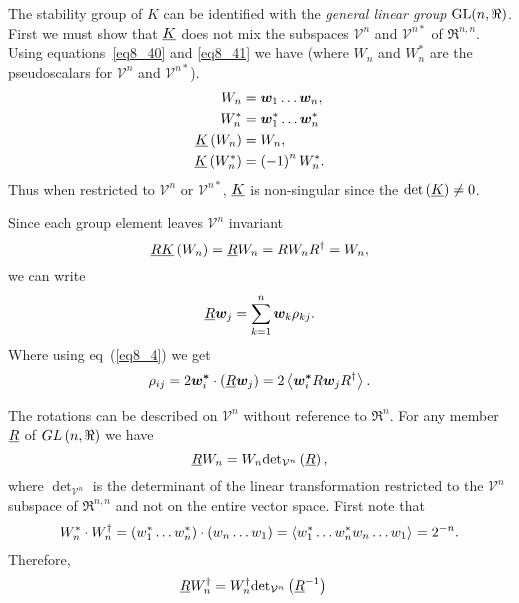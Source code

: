 The stability group of $K$ can be identified with the {\em general linear group} ${\mbox{GL}\!}\left ( {n,\Re} \right )$. First we
must show that $\underline{K}$ does not mix the subspaces $\mathcal{V}^{n}$ and $\mathcal{V}^{n*}$ of
$\Re^{n,n}$.  Using equations~\ref{eq8_40} and \ref{eq8_41} we have (where $W_{n}$ and $W_{n}^{*}$ are the
pseudoscalars for $\mathcal{V}^{n}$ and $\mathcal{V}^{n*}$).
\begin{align}
	W_{n} &= \wb_{1}\dots\wb_{n}, \\
	W_{n}^{*} &= \wb_{1}^{*}\dots\wb_{n}^{*} \\
	\f{\ubar{K}}{W_{n}} &= W_{n}, \\
	\f{\ubar{K}}{W_{n}^{*}} &= \paren{-1}^{n}W_{n}^{*}.	
\end{align}
Thus when restricted to $\mathcal{V}^{n}$ or $\mathcal{V}^{n*}$, $\underline{K}$ is non-singular since the
${\det}\left ( {\underline{K}} \right )\ne 0$.

Since each group element leaves $\mathcal{V}^{n}$ invariant 
\begin{equation}
\underline{R}{\underline{K}}\left ( {W_{n}} \right ) = \underline{R}W_{n} = RW_{n}R^{\dagger} = W_{n},	
\end{equation}
we can write
\begin{equation}
	\underline{R}\bm{w}_{j} = \sum_{k=1}^{n}\bm{w}_{k}\rho_{kj}.
\end{equation}
Where using eq~(\ref{eq8_4}) we get
\begin{equation}
	\rho_{ij} = 2\bm{w^{*}}_{i}\cdot\left ( {\underline{R}\bm{w}_{j}} \right ) = 2\left < {\bm{w^{*}}_{i}R\bm{w}_{j}R^{\dagger}} \right >_{}.
\end{equation}

The rotations can be described on $\mathcal{V}^{n}$ without reference to $\Re^{n}$. For any member $\underline{R}$
of ${GL}\left ( {n,\Re} \right )$ we have
\begin{equation}
	\underline{R}W_{n} = W_{n}{{\det}_{\mathcal{V}^{n}}}\left ( {\underline{R}} \right ),
\end{equation}
where ${\det}_{\mathcal{V}^{n}}$ is the determinant of the linear transformation restricted to the $\mathcal{V}^{n}$
subspace of $\Re^{n,n}$ and not on the entire vector space.  First note that
\begin{equation}
	W_{n}^{*}\cdot W_{n}^{\dagger} = \left ( {w_{1}^{*}\ldots w_{n}^{*}} \right )\cdot\left ( {w_{n}\ldots w_{1}} \right ) =
	                           \left < {w_{1}^{*}\ldots w_{n}^{*}w_{n}\ldots w_{1}} \right >_{} = 2^{-n}.
\end{equation}
Therefore,
\begin{align}
	\underline{R}W_{n}^{\dagger} &= W_{n}^{\dagger}{{\det}_{\mathcal{V}^{n}}}\left ( {\underline{R}^{-1}} \right )
\end{align}

